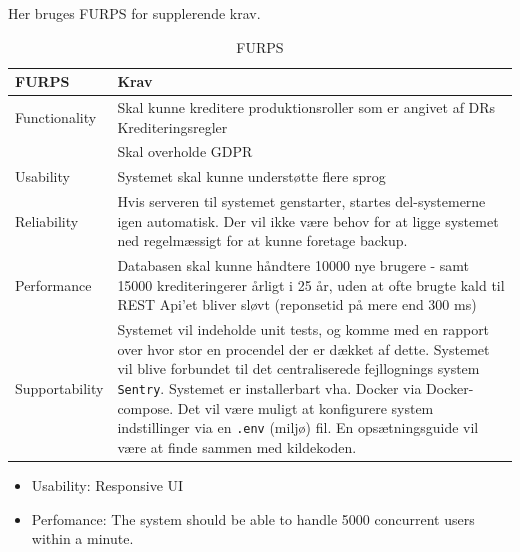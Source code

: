 Her bruges FURPS for supplerende krav.
\begin{table}[ht]
    \begin{tabularx}{\textwidth}{|p{3cm}|X|}
        \hline
        \textbf{FURPS}           &    \textbf{Krav} \\
        \hline
        Functionality           & Skal kunne kreditere produktionsroller som er angivet af DRs Krediteringsregler \\
                                & Skal overholde GDPR \\
        \hline
        Usability       & Systemet skal kunne understøtte flere sprog \\
        \hline
        Reliability     &  Hvis serveren til systemet genstarter, startes del-systemerne igen automatisk. Der vil ikke være behov for at ligge systemet ned regelmæssigt for at kunne foretage backup. \\
        \hline
        Performance     &  Databasen skal kunne håndtere 10000 nye brugere - samt 15000 krediteringerer årligt i 25 år, uden at ofte brugte kald til REST Api'et bliver sløvt (reponsetid på mere end 300 ms) \\
        \hline
        Supportability  &  Systemet vil indeholde unit tests, og komme med en rapport over hvor stor en procendel der er dækket af dette. %
        Systemet vil blive forbundet til det centraliserede fejllognings system \texttt{Sentry}.
        Systemet er installerbart vha. Docker via Docker-compose. %
        Det vil være muligt at konfigurere system indstillinger via en \texttt{.env} (miljø) fil.
        En opsætningsguide vil være at finde sammen med kildekoden. 
        \\ \hline
    \end{tabularx}
    \caption{FURPS}
    \label{tab:furps}
\end{table} 


\begin{itemize}
    \item Usability: Responsive UI
    \item Perfomance: The system should be able to handle 5000 concurrent users within a minute.
\end{itemize}

